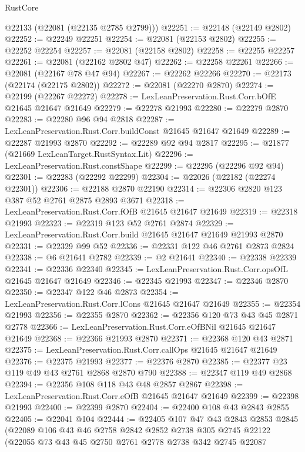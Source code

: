 \begin{lexlean}{RustCore}
\begin{coremodule}
      @22133
      (@22081 (@22135 @2785 @2799)))
@22251 := @22148 (@22149 @2802)
@22252 := @22249 @22251
@22254 := @22081 (@22153 @2802)
@22255 := @22252 @22254
@22257 := @22081 (@22158 @2802)
@22258 := @22255 @22257
@22261 := @22081 (@22162 @2802 @47)
@22262 := @22258 @22261
@22266 := @22081 (@22167 @78 @47 @94)
@22267 := @22262 @22266
@22270 := @22173 (@22174 (@22175 @2802))
@22272 := @22081 (@22270 @2870)
@22274 := @22199 (@22267 @22272)
@22278 := LexLeanPreservation.Rust.Corr.bOfE @21645 @21647 @21649
@22279 := @22278 @21993
@22280 := @22279 @2870
@22283 := @22280 @96 @94 @2818
@22287 := LexLeanPreservation.Rust.Corr.buildConst @21645 @21647 @21649
@22289 := @22287 @21993 @2870
@22292 := @22289 @92 @94 @2817
@22295 := @21877 (@21669 LexLeanTarget.RustSyntax.Lit)
@22296 := LexLeanPreservation.Rust.constShape
@22299 := @22295 (@22296 @92 @94)
@22301 := @22283 (@22292 @22299)
@22304 := @22026 (@22182 (@22274 @22301))
@22306 := @22188 @2870 @22190
@22314 := @22306 @2820 @123 @387 @52 @2761 @2875 @2893 @3671
@22318 := LexLeanPreservation.Rust.Corr.fOfB @21645 @21647 @21649
@22319 := @22318 @21993
@22323 := @22319 @123 @52 @2761 @2874
@22329 := LexLeanPreservation.Rust.Corr.build @21645 @21647 @21649 @21993 @2870
@22331 := @22329 @99 @52
@22336 := @22331 @122 @46 @2761 @2873 @2824
@22338 := @6 @21641 @2782
@22339 := @2 @21641
@22340 := @22338 @22339
@22341 := @22336 @22340
@22345 := LexLeanPreservation.Rust.Corr.opsOfL @21645 @21647 @21649
@22346 := @22345 @21993
@22347 := @22346 @2870
@22350 := @22347 @122 @46 @2873
@22354 := LexLeanPreservation.Rust.Corr.lCons @21645 @21647 @21649
@22355 := @22354 @21993
@22356 := @22355 @2870
@22362 := @22356 @120 @73 @43 @45 @2871 @2778
@22366 := LexLeanPreservation.Rust.Corr.eOfBNil @21645 @21647 @21649
@22368 := @22366 @21993 @2870
@22371 := @22368 @120 @43 @2871
@22375 := LexLeanPreservation.Rust.Corr.callOps @21645 @21647 @21649
@22376 := @22375 @21993
@22377 := @22376 @2870
@22385 := @22377 @23 @119 @49 @43 @2761 @2868 @2870 @790
@22388 := @22347 @119 @49 @2868
@22394 := @22356 @108 @118 @43 @48 @2857 @2867
@22398 := LexLeanPreservation.Rust.Corr.eOfB @21645 @21647 @21649
@22399 := @22398 @21993
@22400 := @22399 @2870
@22404 := @22400 @108 @43 @2843 @2855
@22405 := @22041 @104
@22444 := @22405
    @107
    @47
    @43
    @2843
    @2853
    @2845
    (@22089
      @106
      @43
      @46
      @2758
      @2842
      @2852
      @2738
      @305
      @2745
      @22122
      (@22055
        @73
        @43
        @45
        @2750
        @2761
        @2778
        @2738
        @342
        @2745
        @22087

\end{coremodule}
\end{lexlean}
